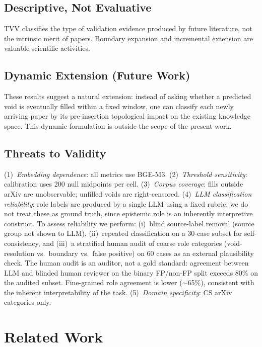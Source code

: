 \documentclass[11pt,twocolumn]{article}
\newcommand{\tvv}{\textsf{TVV}}
\begin{document}
\subsection{Descriptive, Not Evaluative}

\tvv{} classifies the type of validation evidence produced by future literature, not
the intrinsic merit of papers. Boundary expansion and incremental extension are
valuable scientific activities.

\subsection{Dynamic Extension (Future Work)}

These results suggest a natural extension: instead of asking whether a predicted void
is eventually filled within a fixed window, one can classify each newly arriving paper
by its pre-insertion topological impact on the existing knowledge space.
This dynamic formulation is outside the scope of the present work.

\subsection{Threats to Validity}

(1)~\emph{Embedding dependence}: all metrics use BGE-M3.
(2)~\emph{Threshold sensitivity}: calibration uses 200 null midpoints per cell.
(3)~\emph{Corpus coverage}: fills outside arXiv are unobservable; unfilled voids are right-censored.
(4)~\emph{LLM classification reliability}: role labels are produced by a single LLM
using a fixed rubric; we do not treat these as ground truth, since epistemic role is
an inherently interpretive construct. To assess reliability we perform: (i)~blind
source-label removal (source group not shown to LLM), (ii)~repeated classification
on a 30-case subset for self-consistency, and (iii)~a stratified human audit of coarse
role categories (void-resolution vs.\ boundary vs.\ false positive) on 60 cases as an
external plausibility check. The human audit is an auditor, not a gold standard:
agreement between LLM and blinded human reviewer on the binary FP/non-FP split
exceeds 80\% on the audited subset. Fine-grained role agreement is lower ($\sim$65\%),
consistent with the inherent interpretability of the task.
(5)~\emph{Domain specificity}: CS arXiv categories only.

\section{Related Work}
\end{document}
